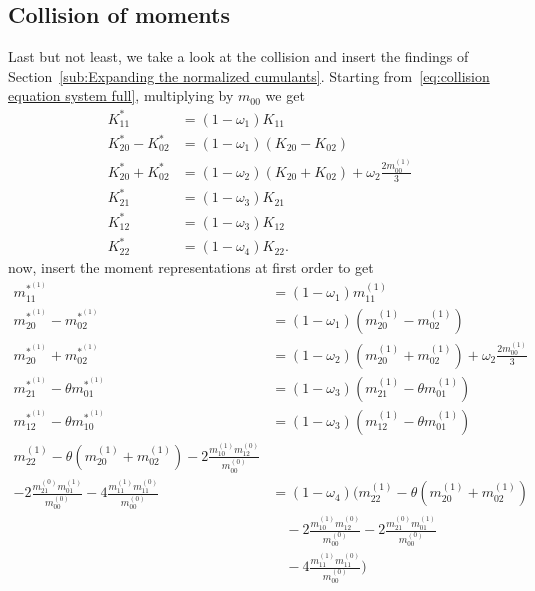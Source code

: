 \subsection{Collision of moments}
\label{sub:Collision of moments}
Last but not least, we take a look at the collision and insert the findings of Section~\ref{sub:Expanding the normalized cumulants}.
Starting from~\eqref{eq:collision equation system full}, multiplying by $m_{00}$ we get
\begin{equation}
  \begin{aligned}
    K_{11}^{*} & = (1-\omega_1)K_{11} \\
    K_{20}^{*} - K_{02}^{*} & = (1-\omega_1) (K_{20} - K_{02}) \\
    K_{20}^{*} + K_{02}^{*} & = (1-\omega_2) (K_{20} + K_{02}) + \omega_2 \frac{2 m_{00}^{(1)}}{3} \\
    K_{21}^{*} & = (1-\omega_3)K_{21} \\
    K_{12}^{*} & = (1-\omega_3)K_{12} \\
    K_{22}^{*} & = (1-\omega_4)K_{22}.
  \end{aligned}
\end{equation}
now, insert the moment representations at first order to get
\begin{equation}
  \begin{aligned}
    m_{11}^{*^{(1)}}
    & = (1-\omega_1)m_{11}^{(1)} \\
%
    m_{20}^{*^{(1)}} - m_{02}^{*^{(1)}}
    & = (1-\omega_1) (m_{20}^{(1)} - m_{02}^{(1)}) \\
%
    m_{20}^{*^{(1)}} + m_{02}^{*^{(1)}}
    & = (1-\omega_2) (m_{20}^{(1)} + m_{02}^{(1)}) + \omega_2 \frac{2 m_{00}^{(1)}}{3} \\
%
    m_{21}^{*^{(1)}} - \theta m_{01}^{*^{(1)}}
    & = (1-\omega_3)(m_{21}^{(1)} - \theta m_{01}^{(1)}) \\
%
    m_{12}^{*^{(1)}} - \theta m_{10}^{*^{(1)}}
    & = (1-\omega_3)(m_{12}^{(1)} - \theta m_{01}^{(1)}) \\
%
m_{22}^{(1)}
  - \theta (m_{20}^{(1)} + m_{02}^{(1)})
  - 2\frac{ m_{10}^{(1)} m_{12}^{(0)} }{m_{00}^{(0)}}&\\
  - 2\frac{ m_{21}^{(0)} m_{01}^{(1)} }{m_{00}^{(0)}}
  - 4\frac{ m_{11}^{(1)} m_{11}^{(0)} }{m_{00}^{(0)}}
    & = (1-\omega_4)\bigg(m_{22}^{(1)}
      - \theta (m_{20}^{(1)} + m_{02}^{(1)})
      \\&\quad
      - 2\frac{ m_{10}^{(1)} m_{12}^{(0)} }{m_{00}^{(0)}}
      - 2\frac{ m_{21}^{(0)} m_{01}^{(1)} }{m_{00}^{(0)}}
      \\&\quad
      - 4\frac{ m_{11}^{(1)} m_{11}^{(0)} }{m_{00}^{(0)}}\bigg) \\
  \end{aligned}
\end{equation}
